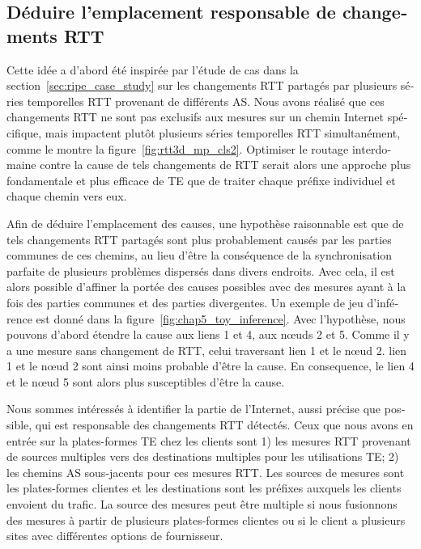 \begin{otherlanguage}{french}
\section*{Déduire l'emplacement responsable de changements RTT}
Cette idée a d'abord été inspirée par l'étude de cas dans la section~\ref{sec:ripe_case_study} sur les changements RTT partagés par plusieurs séries temporelles RTT provenant de différents AS.
Nous avons réalisé que ces changements RTT ne sont pas exclusifs aux mesures sur un chemin Internet spécifique, 
mais impactent plutôt plusieurs séries temporelles RTT simultanément, comme le montre la figure~\ref {fig:rtt3d_mp_cls2}.
Optimiser le routage interdomaine contre la cause de tels changements de RTT serait alors une approche plus fondamentale et plus efficace de TE que de traiter chaque préfixe individuel et chaque chemin vers eux.

Afin de déduire l'emplacement des causes, une hypothèse raisonnable est que de tels changements RTT partagés sont plus probablement causés par les parties communes de ces chemins, 
au lieu d'être la conséquence de la synchronisation parfaite de plusieurs problèmes dispersés dans divers endroits.
Avec cela, il est alors possible d'affiner la portée des causes possibles avec des mesures ayant à la fois des parties communes et des parties divergentes.
Un exemple de jeu d'inférence est donné dans la figure~\ref{fig:chap5_toy_inference}.
Avec l'hypothèse, nous pouvons d'abord étendre la cause aux liens 1 et 4, aux nœuds 2 et 5.
Comme il y a une mesure sans changement de RTT, celui traversant lien 1 et le nœud 2.
lien 1 et le nœud 2 sont ainsi moins probable d'être la cause.
En consequence, le lien 4 et le nœud 5 sont alors plus susceptibles d'être la cause.

Nous sommes intéressés à identifier la partie de l'Internet, aussi précise que possible, qui est responsable des changements RTT détectés.
Ceux que nous avons en entrée sur la plates-formes TE chez les clients sont 1) les mesures RTT provenant de sources multiples vers des destinations multiples pour les utilisations TE; 
2) les chemins AS sous-jacents pour ces mesures RTT.
Les sources de mesures sont les plates-formes clientes et les destinations sont les préfixes auxquels les clients envoient du trafic.
La source des mesures peut être multiple si nous fusionnons des mesures à partir de plusieurs plates-formes clientes ou si le client a plusieurs sites avec différentes options de fournisseur.


\end{otherlanguage}
